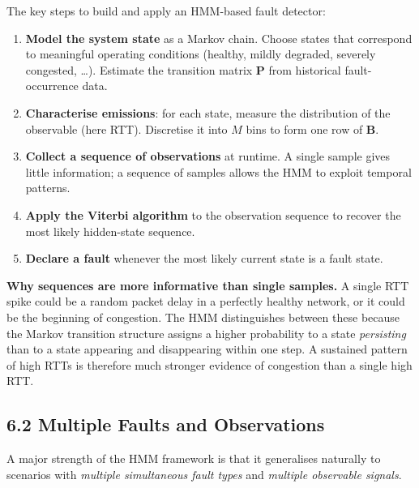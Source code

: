 \documentclass[12pt, a4paper]{article}
\begin{document}
The key steps to build and apply an HMM-based fault detector:
\begin{enumerate}[leftmargin=1.6em, itemsep=4pt]
  \item \textbf{Model the system state} as a Markov chain. Choose states that
    correspond to meaningful operating conditions (healthy, mildly degraded,
    severely congested, \ldots). Estimate the transition matrix $\mathbf{P}$
    from historical fault-occurrence data.
  \item \textbf{Characterise emissions}: for each state, measure the
    distribution of the observable (here RTT). Discretise it into $M$ bins to
    form one row of $\mathbf{B}$.
  \item \textbf{Collect a sequence of observations} at runtime. A single
    sample gives little information; a sequence of samples allows the HMM to
    exploit temporal patterns.
  \item \textbf{Apply the Viterbi algorithm} to the observation sequence to
    recover the most likely hidden-state sequence.
  \item \textbf{Declare a fault} whenever the most likely current state is a
    fault state.
\end{enumerate}

\begin{notebox}
  \textbf{Why sequences are more informative than single samples.}
  A single RTT spike could be a random packet delay in a perfectly healthy
  network, or it could be the beginning of congestion.
  The HMM distinguishes between these because the Markov transition structure
  assigns a higher probability to a state \emph{persisting} than to a state
  appearing and disappearing within one step.
  A sustained pattern of high RTTs is therefore much stronger evidence of
  congestion than a single high RTT.
\end{notebox}

\subsection*{6.2 \quad Multiple Faults and Observations}

A major strength of the HMM framework is that it generalises naturally to
scenarios with \emph{multiple simultaneous fault types} and \emph{multiple
observable signals}.
\end{document}
